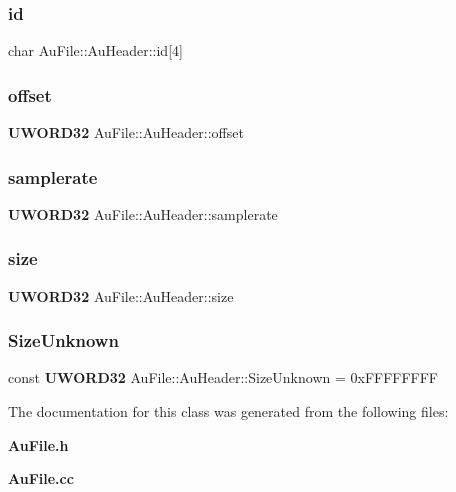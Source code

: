\subsubsection{id}
{\footnotesize\ttfamily char Au\+File\+::\+Au\+Header\+::id[4]}

\mbox{\label{classAuFile_1_1AuHeader_a10a77d6fb987e8b81957b6ff8cf39e48}} 
\subsubsection{offset}
{\footnotesize\ttfamily \textbf{ U\+W\+O\+R\+D32} Au\+File\+::\+Au\+Header\+::offset}

\mbox{\label{classAuFile_1_1AuHeader_a92115913881cd43e7c1f0a0fa4c97a68}} 
\subsubsection{samplerate}
{\footnotesize\ttfamily \textbf{ U\+W\+O\+R\+D32} Au\+File\+::\+Au\+Header\+::samplerate}

\mbox{\label{classAuFile_1_1AuHeader_ad01f795eaf3f88c0fdcaf7ef7e28576e}} 
\subsubsection{size}
{\footnotesize\ttfamily \textbf{ U\+W\+O\+R\+D32} Au\+File\+::\+Au\+Header\+::size}

\mbox{\label{classAuFile_1_1AuHeader_a8b59a6efac10f758e8ba6f8dbe8f94f2}} 
\subsubsection{Size\+Unknown}
{\footnotesize\ttfamily const \textbf{ U\+W\+O\+R\+D32} Au\+File\+::\+Au\+Header\+::\+Size\+Unknown = 0x\+F\+F\+F\+F\+F\+F\+FF\hspace{0.3cm}{\ttfamily [static]}}



The documentation for this class was generated from the following files\+:\begin{DoxyCompactItemize}
\item 
\textbf{ Au\+File.\+h}\item 
\textbf{ Au\+File.\+cc}\end{DoxyCompactItemize}
